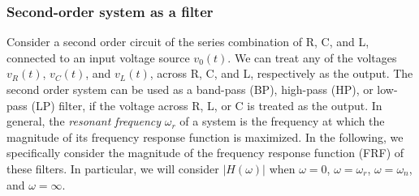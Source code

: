 \documentclass{article}
\begin{document}


\subsubsection*{Second-order system as a filter}

Consider a second order circuit of the series combination of R, C, 
and L, connected to an input voltage source $v_0(t)$. We can treat 
any of the voltages $v_R(t)$, $v_C(t)$, and $v_L(t)$, across R, C, 
and L, respectively as the output. The second order system can be 
used as a band-pass (BP), high-pass (HP), or low-pass (LP) filter, 
if the voltage across R, L, or C is treated as the output. In general, 
the {\em resonant frequency} $\omega_r$ of a system is the frequency 
at which the magnitude of its frequency response function is maximized. 
In the following, we specifically consider the magnitude of the 
frequency response function (FRF) of these filters. In particular,
we will consider $|H(\omega)|$ when $\omega=0$, $\omega=\omega_r$, 
$\omega=\omega_n$, and $\omega=\infty$.
\end{document}
